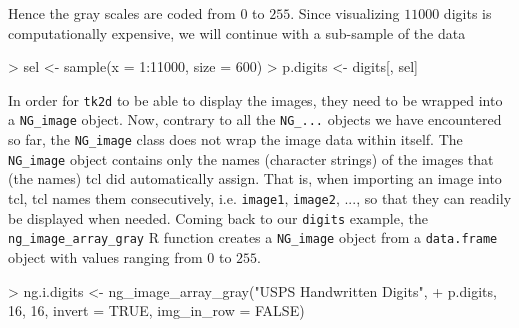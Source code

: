\documentclass[12pt,oneside,titlepage,letter]{article}
\begin{document}
Hence the gray scales are coded from $0$ to $255$. Since visualizing $11000$ digits is computationally expensive, we will continue with a sub-sample of the data
\begin{Schunk}
\begin{Sinput}
> sel <- sample(x = 1:11000, size = 600)
> p.digits <- digits[, sel]
\end{Sinput}
\end{Schunk}
In order for \texttt{tk2d} to be able to display the images, they need to be wrapped into a \texttt{NG\_image} object. Now, contrary to all the \texttt{NG\_...} objects we have encountered so far, the \texttt{NG\_image} class does not wrap the image data within itself. The \texttt{NG\_image} object contains only the names (character strings) of the images that (the names) tcl did automatically assign. That is, when importing an image into tcl, tcl names them consecutively, i.e. \texttt{image1}, \texttt{image2}, ..., so that they can readily be displayed when needed. Coming back to our \texttt{digits} example, the \texttt{ng\_image\_array\_gray} R function creates a \texttt{NG\_image} object from a \texttt{data.frame} object with values ranging from $0$ to $255$.
\begin{Schunk}
\begin{Sinput}
> ng.i.digits <- ng_image_array_gray("USPS Handwritten Digits", 
+     p.digits, 16, 16, invert = TRUE, img_in_row = FALSE)
\end{Sinput}
\end{Schunk}
\end{document}
